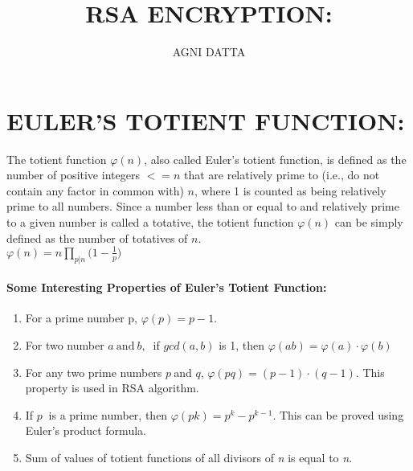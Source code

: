 \documentclass[10pt,fleqn]{article}
\begin{document}
\title{\textbf{\huge{}RSA ENCRYPTION:}}
\author{AGNI DATTA}

\maketitle
\tableofcontents{}

\pagebreak{}

\part{EULER'S TOTIENT FUNCTION:}

The totient function $\varphi(n)$, also called Euler's totient function,
is defined as the number of positive integers $<=n$ that are relatively
prime to (i.e., do not contain any factor in common with) $n$, where
1 is counted as being relatively prime to all numbers. Since a number
less than or equal to and relatively prime to a given number is called
a totative, the totient function $\varphi(n)$ can be simply defined
as the number of totatives of $n$.\\

$\displaystyle\varphi(n)=n\prod_{p|n}\bigg(1-\frac{1}{p}\bigg)$
\\

\subsection{Some Interesting Properties of Euler’s Totient Function:}
\begin{enumerate}
\item For a prime number p, $\varphi(p)= p-1$.
\item For two number $a\:\textrm{and}\:b,\:$ if $gcd(a,b)$ is 1, then
$\varphi(ab)=\varphi(a)\cdot\varphi(b)$
\item For any two prime numbers $p\:$and $q$, $\varphi(pq)=(p-1)\cdot(q-1)$.
This property is used in RSA algorithm. 
\item If $p\:$ is a prime number, then $\varphi(pk)=p^k - p^{k-1}$. This
can be proved using Euler’s product formula.
\item Sum of values of totient functions of all divisors of \textit{n} is equal to \textit{n}.
\end{enumerate}
\end{document}

